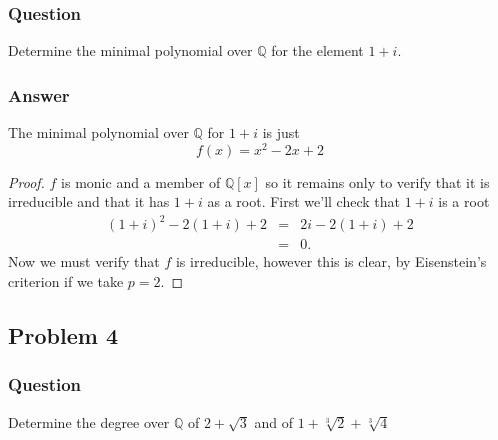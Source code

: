 \documentclass[10pt]{article}
\begin{document}
\subsubsection{Question}
Determine the minimal polynomial over $\mathbb{Q}$ for the element $1+i$.
\subsubsection{Answer}
The minimal polynomial over $\mathbb{Q}$ for $1+i$ is just 
\[f(x)=x^2-2x+2\]
\begin{proof}
$f$ is monic and a member of $\mathbb{Q}[x]$ so it remains only to verify that it is irreducible and that it has $1+i$ as a root. First we'll check that $1+i$ is a root
\begin{eqnarray*}(1+i)^2-2(1+i)+2&=&2i-2(1+i)+2 \\ &=&0.\end{eqnarray*}
Now we must verify that $f$ is irreducible, however this is clear, by Eisenstein's criterion if we take $p=2$.
\end{proof}

\subsection{Problem 4}
\subsubsection{Question}
Determine the degree over $\mathbb{Q}$ of $2+\sqrt3$ and of $1+\sqrt[3]{2}+\sqrt[3]{4}$
\end{document}
